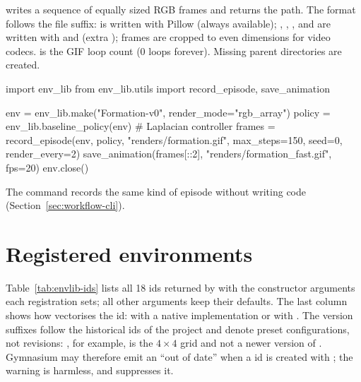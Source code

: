  writes a sequence of equally sized RGB frames and
returns the path. The format follows the file suffix:  is written
with Pillow (always available); , , ,
 and  are written with  and
 (extra ); frames are cropped to even
dimensions for video codecs.  is the GIF loop count
(0 loops forever). Missing parent directories are created.

\begin{pycode}
import env_lib
from env_lib.utils import record_episode, save_animation

env = env_lib.make("Formation-v0", render_mode="rgb_array")
policy = env_lib.baseline_policy(env)                    # Laplacian controller
frames = record_episode(env, policy, "renders/formation.gif",
                        max_steps=150, seed=0, render_every=2)
save_animation(frames[::2], "renders/formation_fast.gif", fps=20)
env.close()
\end{pycode}

The command 
records the same kind of episode without writing code
(Section~\ref{sec:workflow-cli}).

\section{Registered environments}\label{sec:envlib-ids}

Table~\ref{tab:envlib-ids} lists all 18 ids returned by
 with the constructor arguments each registration
sets; all other arguments keep their defaults. The last column shows how
 vectorises the id: with a native implementation or
with . The version suffixes follow the historical ids of
the project and denote preset configurations, not revisions:
, for example, is the $4 \times 4$ grid and not a newer
version of . Gymnasium may therefore emit an ``out of
date''  when a  id is created with
; the warning is harmless, and 
suppresses it.

